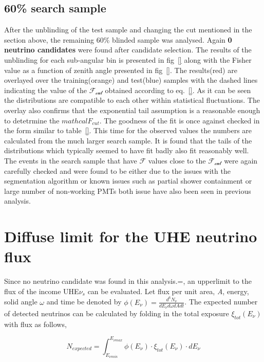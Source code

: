 \subsection{60\% search sample}
\label{subsec:unblind_60}
After the unblinding of the test sample and changing the cut mentioned in the section above, the remaining 60\% blinded sample was analysed. Again \textbf{0 neutrino candidates} were found after candidate selection. The results of the unblinding for each sub-angular bin is presented in fig~\ref{} along with the Fisher value as a function of zenith angle presented in fig~\ref{}. The results(red) are overlayed over the training(orange) and test(blue) samples with the dashed lines indicating the value of the $\mathcal{F_{cut}}$ obtained according to eq.~\ref{}. As it can be seen the distributions are compatible to each other within statistical fluctuations. The overlay also confirms that the exponential tail assumption is a reasonable enough to detetrmine the $mathcal{F_{cut}}$. The goodness of the fit is once against checked in the form similar to table~\ref{}. This time for the observed values the numbers are calculated from the much larger search sample.  It is found that the tails of the distributions which typically seemed to have fit badly also fit reasonably well. The events in the search sample that have $\mathcal{F}$ values close to the $\mathcal{F_{cut}}$ were again carefully checked and were found to be either due to the issues with the segmentation algorithm or known issues such as partial shower containment or large number of non-working PMTs both issue have also been seen in previous analysis. 

\section{Diffuse limit for the UHE neutrino flux}
\label{sec:diff_limit}
Since no neutrino candidate was found in this analysis.=, an upperlimit to the flux of the income UHE$\nu_s$ can be evaluated. Let flux per unit area, \textit{A}, energy, solid angle $\omega$ and time be denoted by $\phi(E_{\nu}) = \frac{d^6 N_{\nu}}{dE_{\nu}d\omega dA dt}$. The expected number of detected neutrinos can be calculated by folding in the total exposure $\xi_{tot}(E_{\nu})$ with flux as follows,

\begin{equation}
  N_{expected} = \int_{E_{\nu min}}^{E_{\nu max}} \phi(E_{\nu}) \cdot \xi_{tot}(E_{\nu}) \cdot dE_{\nu}
\end{equation}

